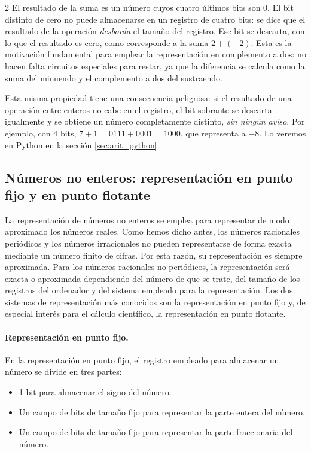 \begin{paracol}{2}
El resultado de la suma es un número cuyos cuatro últimos bits son 0. El bit distinto de cero no puede almacenarse en un registro de cuatro bits: se dice que el resultado de la operación \emph{desborda} el tamaño del registro. Ese bit se descarta, con lo que el resultado es cero, como corresponde a la suma $2+(-2)$. Esta es la motivación fundamental para emplear la representación en complemento a dos: no hacen falta circuitos especiales para restar, ya que la diferencia se calcula como la suma del minuendo y el complemento a dos del sustraendo.

Esta misma propiedad tiene una consecuencia peligrosa: si el resultado de una operación entre enteros no cabe en el registro, el bit sobrante se descarta igualmente y se obtiene un número completamente distinto, \emph{sin ningún aviso}. Por ejemplo, con 4 bits, $7+1=0111+0001=1000$, que representa a $-8$. Lo veremos en Python en la sección \ref{sec:arit_python}.

\subsection{Números no enteros: representación en punto fijo y en punto flotante}
La representación de números no enteros se emplea para representar de modo aproximado los números reales. Como hemos dicho antes, los números racionales periódicos y los números irracionales no pueden representarse de forma exacta mediante un número finito de cifras. Por esta razón, su representación es siempre aproximada. Para los números racionales no periódicos, la representación será exacta o aproximada dependiendo del número de que se trate, del tamaño de los registros del ordenador y del sistema empleado para la representación. Los dos sistemas de representación más conocidos son la representación en punto fijo y, de especial interés para el cálculo científico, la representación en punto flotante.

\paragraph*{Representación en punto fijo.} En la representación en punto fijo, el registro empleado para almacenar un número se divide en tres partes:
\begin{itemize}
\item 1 bit para almacenar el signo del número.
\item Un campo de bits de tamaño fijo para representar la parte entera del número.
\item Un campo de bits de tamaño fijo para representar la parte fraccionaria del número.
\end{itemize}


\end{paracol}
